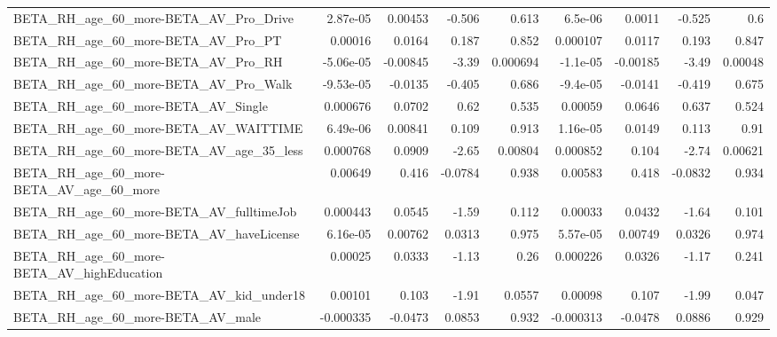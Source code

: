 \begin{tabular}{lrrrrrrrr}
BETA\_RH\_age\_60\_more-BETA\_AV\_Pro\_Drive              &    2.87e-05 &      0.00453 &    -0.506 &    0.613 &    6.5e-06 &      0.0011 &       -0.525 &           0.6 \\
BETA\_RH\_age\_60\_more-BETA\_AV\_Pro\_PT                 &     0.00016 &       0.0164 &     0.187 &    0.852 &   0.000107 &      0.0117 &        0.193 &         0.847 \\
BETA\_RH\_age\_60\_more-BETA\_AV\_Pro\_RH                 &   -5.06e-05 &     -0.00845 &     -3.39 & 0.000694 &   -1.1e-05 &    -0.00185 &        -3.49 &       0.00048 \\
BETA\_RH\_age\_60\_more-BETA\_AV\_Pro\_Walk               &   -9.53e-05 &      -0.0135 &    -0.405 &    0.686 &   -9.4e-05 &     -0.0141 &       -0.419 &         0.675 \\
BETA\_RH\_age\_60\_more-BETA\_AV\_Single                 &    0.000676 &       0.0702 &      0.62 &    0.535 &    0.00059 &      0.0646 &        0.637 &         0.524 \\
BETA\_RH\_age\_60\_more-BETA\_AV\_WAITTIME               &    6.49e-06 &      0.00841 &     0.109 &    0.913 &   1.16e-05 &      0.0149 &        0.113 &          0.91 \\
BETA\_RH\_age\_60\_more-BETA\_AV\_age\_35\_less            &    0.000768 &       0.0909 &     -2.65 &  0.00804 &   0.000852 &       0.104 &        -2.74 &       0.00621 \\
BETA\_RH\_age\_60\_more-BETA\_AV\_age\_60\_more            &     0.00649 &        0.416 &   -0.0784 &    0.938 &    0.00583 &       0.418 &      -0.0832 &         0.934 \\
BETA\_RH\_age\_60\_more-BETA\_AV\_fulltimeJob            &    0.000443 &       0.0545 &     -1.59 &    0.112 &    0.00033 &      0.0432 &        -1.64 &         0.101 \\
BETA\_RH\_age\_60\_more-BETA\_AV\_haveLicense            &    6.16e-05 &      0.00762 &    0.0313 &    0.975 &   5.57e-05 &     0.00749 &       0.0326 &         0.974 \\
BETA\_RH\_age\_60\_more-BETA\_AV\_highEducation          &     0.00025 &       0.0333 &     -1.13 &     0.26 &   0.000226 &      0.0326 &        -1.17 &         0.241 \\
BETA\_RH\_age\_60\_more-BETA\_AV\_kid\_under18            &     0.00101 &        0.103 &     -1.91 &   0.0557 &    0.00098 &       0.107 &        -1.99 &         0.047 \\
BETA\_RH\_age\_60\_more-BETA\_AV\_male                   &   -0.000335 &      -0.0473 &    0.0853 &    0.932 &  -0.000313 &     -0.0478 &       0.0886 &         0.929 \\

\end{tabular}
